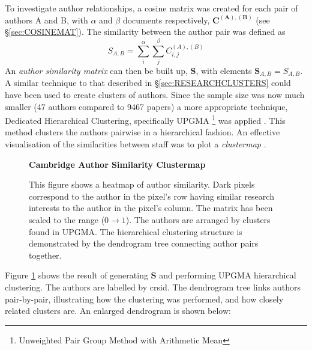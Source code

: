 To investigate author relationships, a cosine matrix was created for each pair of authors A and B, with $\alpha$ and $\beta$ documents respectively, $\mathbf{C^{\left( A \right ) , \left( B \right)}}$ (see \S\ref{sec:COSINEMAT}). The similarity between the author pair was defined as 
$$S_{A , B} = \sum_{i}^{\alpha} \sum_{j}^{\beta} C^{\left( A \right) , \left( B \right) }_{ i , j }$$
An \emph{author similarity matrix} can then be built up, $\mathbf{S}$, with elements $\mathbf{S}_{ A , B }=S_{ A , B }$.
A similar technique to that described in  \S\ref{sec:RESEARCHCLUSTERS} could have been used to create clusters of authors. Since the sample size was now much smaller (47 authors compared to 9467 papers) a more appropriate technique, Dedicated Hierarchical Clustering, specifically UPGMA \footnote{Unweighted Pair Group Method with Arithmetic Mean} was applied \cite{heatmapcluster}. This method clusters the authors pairwise in a hierarchical fashion.  An effective visualisation of the similarities between staff was to plot a \emph{clustermap} \cite{seaborn} \cite{scipy}.
\begin{center}
\begin{figure}[H]
  \centering
  \textbf{Cambridge Author Similarity Clustermap}
    \caption[Cambrdige Author Similarity Clustermap]{This figure shows a heatmap of author similarity. Dark pixels correspond to the author in the pixel's row having similar research interests to the author in the pixel's column. The matrix has been scaled to the range ($0 \rightarrow 1$).  The authors are arranged by clusters found in UPGMA. The hierarchical clustering structure is demonstrated by the dendrogram tree connecting author pairs together.}
    \label{fig:AUTHORSIMS}

\end{figure} 
\end{center}
Figure \ref{fig:AUTHORSIMS} shows the result of generating $\textbf{S}$ and performing UPGMA hierarchical clustering. The authors are labelled by crsid. The dendrogram tree links authors pair-by-pair, illustrating how the clustering was performed, and how closely related clusters are. An enlarged dendrogram is shown below:
